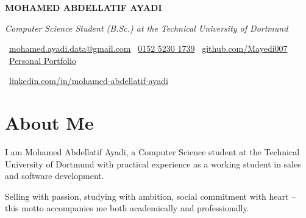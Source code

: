 \documentclass[10pt, letterpaper]{article}
\newenvironment{header}{
    \setlength{\topsep}{0pt}\par\kern\topsep\centering\linespread{1.5}
}{
    \par\kern\topsep
} %
\begin{document}
    \newcommand{\AND}{\unskip
        \cleaders\copy\ANDbox\hskip\wd\ANDbox
        \ignorespaces
    }
    \newsavebox\ANDbox
    \sbox\ANDbox{$|$}

    \begin{header}
   \begin{center}

    \vspace{0.5cm} %
    {\fontsize{20pt}{24pt}\selectfont \textbf{MOHAMED ABDELLATIF AYADI}}
\end{center}
        
\vspace{5 pt}

    \normalsize
    \textit{Computer Science Student (B.Sc.) at the Technical University of Dortmund}

        \vspace{5 pt}

      \faEnvelope\ \href{mailto:mohamed.ayadi.data@gmail.com}{\textcolor{primaryColor}{mohamed.ayadi.data@gmail.com}} \quad
\faPhone\ \href{tel:+49-152-5230-1739}{\textcolor{primaryColor}{0152 5230 1739}} \quad
\faGithub\ \href{https://github.com/Mayedi007}{\textcolor{primaryColor}{github.com/Mayedi007}} \quad
\faGlobe\ \href{https://personal-portfolio-mohamedayadidat.replit.app}{\textcolor{portfolioColor}{Personal Portfolio}} \quad

\faLinkedin\ \href{https://linkedin.com/in/mohamed-abdellatif-ayadi}{\textcolor{primaryColor}{linkedin.com/in/mohamed-abdellatif-ayadi}}

    \end{header}

    \vspace{1cm}

\section*{About Me}

I am Mohamed Abdellatif Ayadi, a Computer Science student at the Technical University of Dortmund with practical experience as a working student in sales and software development.

Selling with passion, studying with ambition, social commitment with heart – this motto accompanies me both academically and professionally.
\end{document}

